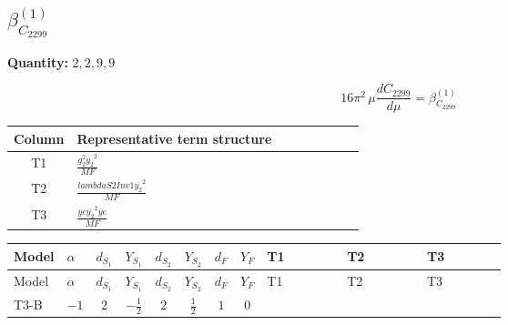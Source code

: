 \documentclass[8pt]{article}
\begin{document}
\begin{landscape}
\section*{$\beta_{C_{2299}}^{(1)}$}
\noindent\textbf{Quantity: }$\mathrm{2,2,9,9}$\par\smallskip
\[16\pi^2\,\mu\frac{d C_{2299}}{d\mu}=\beta_{C_{2299}}^{(1)}\]
\begin{center}
\begin{tabular}{@{}c >{\raggedright\arraybackslash}p{0.82\linewidth}@{}}
\toprule
Column & Representative term structure \\
\midrule
T1 & \(\displaystyle \frac{g_{2}^{2} \overline{y_{2}}^{2}}{MF}\) \\
\midrule
T2 & \(\displaystyle \frac{lambdaS2Inv1 \overline{y_{2}}^{2}}{MF}\) \\
\midrule
T3 & \(\displaystyle \frac{ye \overline{y_{2}}^{2} \overline{ye}}{MF}\) \\
\midrule
\bottomrule
\end{tabular}
\end{center}
\smallskip
\tiny
\begin{longtable}{@{}llcccccc >{\raggedright\arraybackslash}p{0.21\linewidth} >{\raggedright\arraybackslash}p{0.21\linewidth} >{\raggedright\arraybackslash}p{0.21\linewidth}@{}}
\toprule
Model & $\alpha$ & $d_{S_1}$ & $Y_{S_1}$ & $d_{S_2}$ & $Y_{S_2}$ & $d_F$ & $Y_F$ & T1 & T2 & T3 \\
\midrule
\endfirsthead
\toprule
Model & $\alpha$ & $d_{S_1}$ & $Y_{S_1}$ & $d_{S_2}$ & $Y_{S_2}$ & $d_F$ & $Y_F$ & T1 & T2 & T3 \\
\midrule
\endhead
T3-B & $-1$ & $2$ & $-\frac{1}{2}$ & $2$ & $\frac{1}{2}$ & $1$ & $0$ & \scriptsize\adjustbox{max width=\linewidth}{$\begin{gathered} - \frac{3 g_{2}^{2} \overline{y_{2}}^{2}}{4 MF}\end{gathered}$} & \scriptsize\adjustbox{max width=\linewidth}{$\begin{gathered} - \frac{lambdaS2Inv1 \overline{y_{2}}^{2}}{2 MF}\end{gathered}$} & \scriptsize\adjustbox{max width=\linewidth}{$\begin{gathered} \frac{ye \overline{y_{2}}^{2} \overline{ye}}{4 MF}\end{gathered}$} \\
\midrule
\bottomrule
\end{longtable}
\clearpage

\end{landscape}
\end{document}
